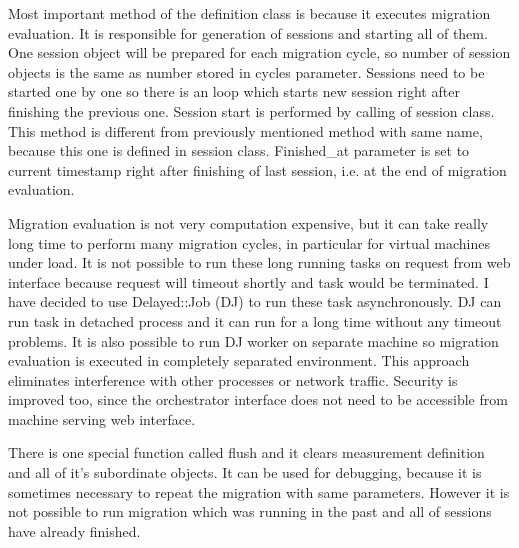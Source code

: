 Most important method of the definition class is  because it executes migration evaluation. It is responsible for generation of sessions and starting all of them. One session object will be prepared for each migration cycle, so number of session objects is the same as number stored in cycles parameter. Sessions need to be started one by one so there is an loop which starts new session right after finishing the previous one. Session start is performed by calling  of session class. This method is different from previously mentioned method with same name, because this one is defined in session class.
Finished\_at parameter is set to current timestamp right after finishing of last session, i.e. at the end of migration evaluation. 

Migration evaluation is not very computation expensive, but it can take really long time to perform many migration cycles, in particular for virtual machines under load. It is not possible to run these long running tasks on request from web interface because request will timeout shortly and task would be terminated. I have decided to use Delayed::Job (\Ac{DJ}) to run these task asynchronously.
\Ac{DJ} can run task in detached process and it can run for a long time without any timeout problems. It is also possible to run \Ac{DJ} worker on separate machine so migration evaluation is executed in completely separated environment. This approach eliminates interference with other processes or network traffic. Security is improved too, since the orchestrator interface does not need to be accessible from machine serving web interface.

There is one special function called flush and it clears measurement definition and all of it's subordinate objects. It can be used for debugging, because it is sometimes necessary to repeat the migration with same parameters. However it is not possible to run migration which was running in the past and all of sessions have already finished.

